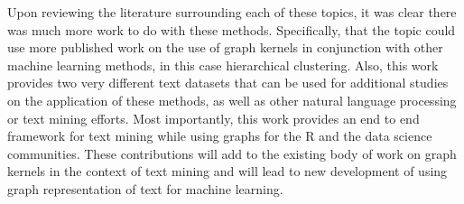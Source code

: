 Upon reviewing the literature surrounding each of these topics, it was clear there was much more work to do with these methods. Specifically, that the topic could use more published work on the use of graph kernels in conjunction with other machine learning methods, in this case hierarchical clustering. Also, this work provides two very different text datasets that can be used for additional studies on the application of these methods, as well as other natural language processing or text mining efforts. Most importantly, this work provides an end to end framework for text mining while using graphs for the R and the data science communities. These contributions will add to the existing body of work on graph kernels in the context of text mining and will lead to new development of using graph representation of text for machine learning.











